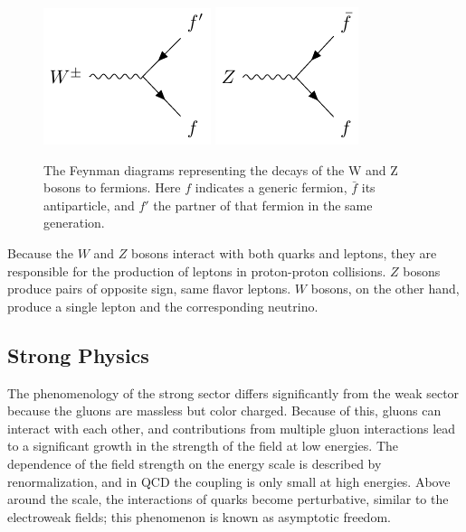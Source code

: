 \begin{figure}
\includegraphics[width=\halffig]{figures/feyn_wdecay.pdf}
\includegraphics[width=\halffig]{figures/feyn_zdecay.pdf}\\
\caption{The Feynman diagrams representing the decays of the W and Z bosons to fermions. Here $f$ indicates a generic fermion, $\bar{f}$ its antiparticle, and $f'$ the partner of that fermion in the same generation.}
\label{fig:feyn_weak}
\end{figure}

Because the $W$ and $Z$ bosons interact with both quarks and leptons, they are responsible for the production of leptons in proton-proton collisions.
$Z$ bosons produce pairs of opposite sign, same flavor leptons.
$W$ bosons, on the other hand, produce a single lepton and the corresponding neutrino.

\subsection{Strong Physics}

The phenomenology of the strong sector differs significantly from the weak sector because the gluons are massless but color charged.
Because of this, gluons can interact with each other, and contributions from multiple gluon interactions lead to a significant growth in the strength of the field at low energies.
The dependence of the field strength on the energy scale is described by renormalization, and in \ac{QCD} the coupling is only small at high energies.
Above around the \GeV scale, the interactions of quarks become perturbative, similar to the electroweak fields; this phenomenon is known as asymptotic freedom.

